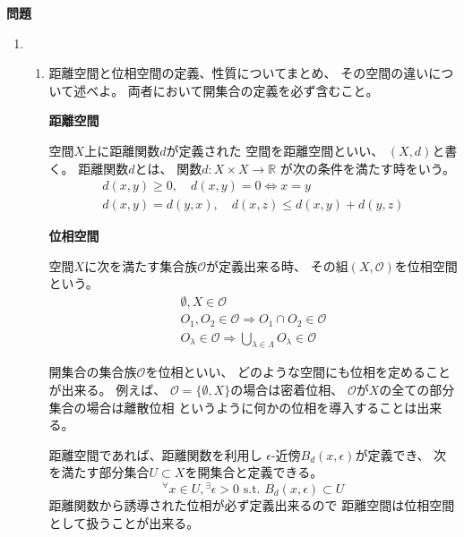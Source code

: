 \documentclass[12pt,b5paper]{ltjsarticle}
\begin{document}
\hrulefill
\textbf{問題}
\hrulefill


\begin{enumerate}
 \item
      \begin{enumerate}
       \item
            距離空間と位相空間の定義、性質についてまとめ、
            その空間の違いについて述べよ。
            両者において開集合の定義を必ず含むこと。

            \dotfill

            \textbf{距離空間}

            空間$X$上に距離関数$d$が定義された
            空間を距離空間といい、
            $(X,d)$と書く。
            距離関数$d$とは、
            関数$d: X\times X \to \mathbb{R}$
            が次の条件を満たす時をいう。
            \begin{gather}
             d(x,y) \geq 0, \quad d(x,y)=0 \Leftrightarrow x=y\\
             d(x,y) = d(y,x), \quad d(x,z) \leq d(x,y)+d(y,z)
            \end{gather}


            \textbf{位相空間}

            空間$X$に次を満たす集合族$\mathcal{O}$が定義出来る時、
            その組$(X,\mathcal{O})$を位相空間という。
            \begin{gather}
             \emptyset, X \in\mathcal{O}\\
             O_{1},O_{2}\in\mathcal{O} \Rightarrow O_{1}\cap O_{2}\in\mathcal{O}\\
             O_{\lambda}\in\mathcal{O} \Rightarrow \bigcup_{\lambda\in\Lambda}O_{\lambda}\in\mathcal{O}
            \end{gather}

            開集合の集合族$\mathcal{O}$を位相といい、
            どのような空間にも位相を定めることが出来る。
            例えば、
            $\mathcal{O}=\{\emptyset,X\}$の場合は密着位相、
            $\mathcal{O}$が$X$の全ての部分集合の場合は離散位相
            というように何かの位相を導入することは出来る。

            距離空間であれば、距離関数を利用し
            $\epsilon$-近傍$B_{d}(x,\epsilon)$が定義でき、
            次を満たす部分集合$U\subset X$を開集合と定義できる。
            \begin{equation}
             {}^{\forall}x\in U, {}^{\exists}\epsilon>0
              \text{ s.t. } B_{d}(x,\epsilon) \subset U
            \end{equation}
            距離関数から誘導された位相が必ず定義出来るので
            距離空間は位相空間として扱うことが出来る。


\end{enumerate}
\end{enumerate}
\end{document}
